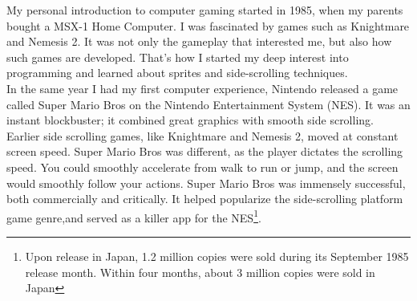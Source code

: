 \documentclass[book.tex]{subfiles}
\begin{document}
My personal introduction to computer gaming started in 1985, when my parents bought a MSX-1 Home Computer. I was fascinated by games such as Knightmare and Nemesis 2. It was not only the gameplay that interested me, but also how such games are developed. That's how I started my deep interest into programming and learned about sprites and side-scrolling techniques.\\
In the same year I had my first computer experience, Nintendo released a game called Super Mario Bros on the Nintendo Entertainment System (NES). It was an instant blockbuster; it combined great graphics with smooth side scrolling. Earlier side scrolling games, like Knightmare and Nemesis 2, moved at constant screen speed. Super Mario Bros was different, as the player dictates the scrolling speed. You could smoothly accelerate from walk to run or jump, and the screen would smoothly follow your actions. Super Mario Bros was immensely successful, both commercially and critically. It helped popularize the side-scrolling platform game genre,and served as a killer app for the NES\footnote{Upon release in Japan, 1.2 million copies were sold during its September 1985 release month. Within four months, about 3 million copies were sold in Japan}.
\end{document}
